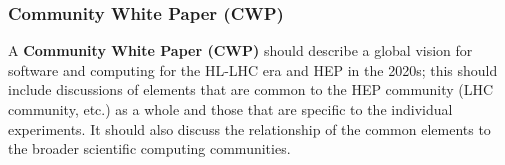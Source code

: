 \begin{frame}
\frametitle{Community White Paper (CWP)}

\noindent A {\bf Community White Paper (CWP)} should describe a global
vision for software and computing for the HL-LHC era and HEP in the 2020s;
this should include discussions of elements that are common to
the HEP community (LHC community, etc.) as a whole and those that are specific
to the individual experiments.
It should also discuss the relationship of the common elements
to the broader scientific computing communities.

\end{frame}


